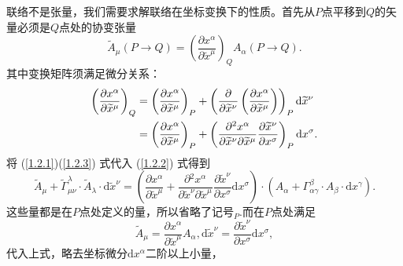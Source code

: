 \documentclass[11pt, a4paper, oneside, onecolumn]{ctexart}
\numberwithin{equation}{subsection}
\begin{document}
联络不是张量，我们需要求解联络在坐标变换下的性质。首先从$P$点平移到$Q$的矢量必须是$Q$点处的协变张量
\begin{equation}
\widetilde{A}_{\mu}\left(P\to Q\right)=\left(\frac{\partial{}x^{\alpha}}{\partial{}\widetilde{x}^{\mu}}\right)_{Q}A_{\alpha}\left(P\to Q\right).\label{1.2.2}
\end{equation}
其中变换矩阵须满足微分关系：
\begin{align}
\left(\frac{\partial{}x^{\alpha}}{\partial{}\widetilde{x}^{\mu}}\right)_{Q}&=\left(\frac{\partial{}x^{\alpha}}{\partial{}\widetilde{x}^{\mu}}\right)_{P}+\left(\frac{\partial{}}{\partial{}\widetilde{x}^{\nu}}\left(\frac{\partial{}x^{\alpha}}{\partial{}\widetilde{x}^{\mu}}\right)\right)_{P}\mathrm{d}\widetilde{x}^{\nu}\notag\\
&=\left(\frac{\partial{}x^{\alpha}}{\partial{}\widetilde{x}^{\mu}}\right)_{P}+\left(\frac{\partial{}^{2}x^{\alpha}}{\partial{}\widetilde{x}^{\nu}\partial{}\widetilde{x}^{\mu}}\frac{\partial{}\widetilde{x}^{\nu}}{\partial{}x^{\sigma}}\right)_{P}\mathrm{d}x^{\sigma}.\label{1.2.3}
\end{align}
将 (\ref{1.2.1})(\ref{1.2.3}) 式代入 (\ref{1.2.2}) 式得到
\begin{equation}
\widetilde{A}_{\mu}+\widetilde{\Gamma}_{\mu\nu}^{\lambda}\cdot\widetilde{A}_{\lambda}\cdot\mathrm{d}\widetilde{x}^{\nu}=\left(\frac{\partial{}x^{\alpha}}{\partial{}\widetilde{x}^{\mu}}+\frac{\partial{}^{2}x^{\alpha}}{\partial{}\widetilde{x}^{\nu}\partial{}\widetilde{x}^{\mu}}\frac{\partial{}\widetilde{x}^{\nu}}{\partial{}x^{\sigma}}\mathrm{d}x^{\sigma}\right)\cdot\left(A_{\alpha}+\Gamma_{\alpha\gamma}^{\beta}\cdot A_{\beta}\cdot\mathrm{d}x^{\gamma}\right).
\end{equation}
这些量都是在$P$点处定义的量，所以省略了记号${}_{P}$.而在$P$点处满足
\begin{equation}
\widetilde{A}_{\mu}=\frac{\partial{}x^{\alpha}}{\partial{}\widetilde{x}^{\mu}}A_{\alpha},\mathrm{d}\widetilde{x}^{\nu}=\frac{\partial{}\widetilde{x}^{\nu}}{\partial{}x^{\sigma}}\mathrm{d}x^{\sigma},
\end{equation}
代入上式，略去坐标微分$\mathrm{d}x^{\alpha}$二阶以上小量，
\end{document}
